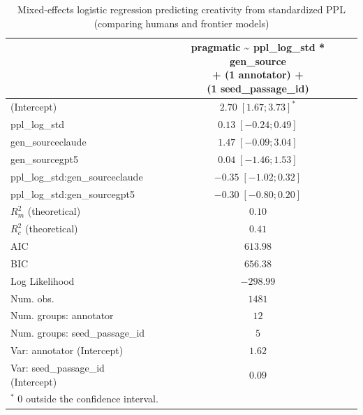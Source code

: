 
\usepackage{booktabs}

\begin{table}[htbp]
\begin{center}
\begin{tabular}{l c}
\toprule
 & \shortstack[l]{pragmatic \textasciitilde{} ppl\_log\_std * gen\_source  \\ 
+ (1 \textbar{} annotator) + \\ 
(1 \textbar{} seed\_passage\_id)} \\
\midrule
(Intercept)                        & $2.70 \; [ 1.67; 3.73]^{*}$ \\
ppl\_log\_std                      & $0.13 \; [-0.24; 0.49]$     \\
gen\_sourceclaude                  & $1.47 \; [-0.09; 3.04]$     \\
gen\_sourcegpt5                    & $0.04 \; [-1.46; 1.53]$     \\
ppl\_log\_std:gen\_sourceclaude    & $-0.35 \; [-1.02; 0.32]$    \\
ppl\_log\_std:gen\_sourcegpt5      & $-0.30 \; [-0.80; 0.20]$    \\
\midrule
$R^2_m$ (theoretical)              & $0.10$                      \\
$R^2_c$ (theoretical)              & $0.41$                      \\
AIC                                & $613.98$                    \\
BIC                                & $656.38$                    \\
Log Likelihood                     & $-298.99$                   \\
Num. obs.                          & $1481$                      \\
Num. groups: annotator             & $12$                        \\
Num. groups: seed\_passage\_id     & $5$                         \\
Var: annotator (Intercept)         & $1.62$                      \\
Var: seed\_passage\_id (Intercept) & $0.09$                      \\
\bottomrule
\multicolumn{2}{l}{\scriptsize{$^*$ 0 outside the confidence interval.}}
\end{tabular}
\caption{Mixed-effects logistic regression predicting creativity from standardized PPL (comparing humans and frontier models)}
\label{tab:glmer_ppl_prag_src_front}
\end{center}
\end{table}
